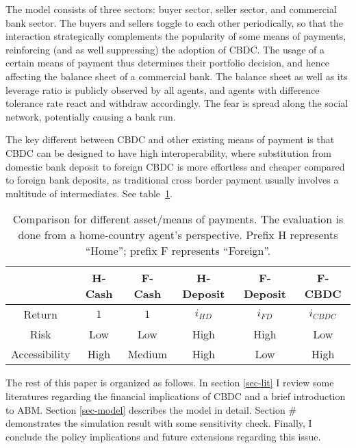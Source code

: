 The model consists of three sectors: buyer sector, seller sector, and commercial
bank sector. The buyers and sellers toggle to each other periodically, so that
the interaction strategically complements the popularity of some means of
payments, reinforcing (and as well suppressing) the adoption of CBDC. The
usage of a certain means of payment thus determines their portfolio decision,
and hence affecting the balance sheet of a commercial bank. The balance sheet as
well as its leverage ratio is publicly observed by all agents, and agents with
difference tolerance rate react and withdraw accordingly. The fear is spread
along the social network, potentially causing a bank run.

The key different between CBDC and other existing means of payment is that CBDC
can be designed to have high interoperability, where substitution from domestic
bank deposit to foreign CBDC is more effortless and cheaper compared to foreign
bank deposits, as traditional cross border payment usually involves a multitude
of intermediates. See table~\ref{table: compare-mop}.

\begin{table}[t]
    \centering
    \begin{tabular}{c c c c c c}
        &H-Cash&F-Cash&H-Deposit&F-Deposit& F-CBDC \\
        \hline
        Return & $1$ & $1$ & $i_{HD}$ & $i_{FD}$ & $i_{CBDC}$ \\
        Risk & Low & Low & High & High & Low \\
        Accessibility & High & Medium & High & Low & High \\
        \hline
    \end{tabular}
    \caption{Comparison for different asset/means of payments. The evaluation is
    done from a home-country agent's perspective. Prefix H represents ``Home'';
    prefix F represents ``Foreign''.}
    \label{table: compare-mop}
\end{table}

The rest of this paper is organized as follows. In section \ref{sec-lit} I review some
literatures regarding the financial implications of CBDC and a brief
introduction to ABM. Section \ref{sec-model} describes the model in detail. Section \#
demonstrates the simulation result with some sensitivity check. Finally, I
conclude the policy implications and future extensions regarding this issue.
